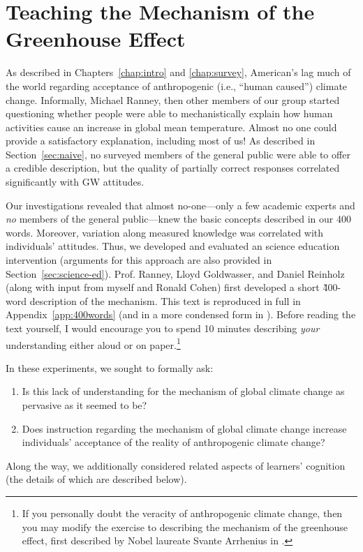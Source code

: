 \graphicspath{{mechanism/}}

\chapter{Teaching the Mechanism of the Greenhouse Effect}
\label{chap:mechanism}

As described in Chapters~\ref{chap:intro} and \ref{chap:survey}, American's lag
much of the world regarding acceptance of anthropogenic (i.e., “human caused”)
climate change. Informally, Michael Ranney, then other members of our group
started questioning whether people were able to mechanistically explain how
human activities cause an increase in global mean temperature.  Almost no one
could provide a satisfactory explanation, including most of us! As described in
Section~\ref{sec:naive}, no surveyed members of the general public were able to
offer a credible description, but the quality of partially correct responses
correlated significantly with GW attitudes. 

Our investigations revealed that almost no-one---only a few academic
experts and \emph{no} members of the general public---knew the basic
concepts described in our 400 words. Moreover, variation along measured
knowledge was correlated with individuals' attitudes. Thus, we developed and evaluated an
science education intervention (arguments for this approach are also provided in
Section~\ref{sec:science-ed}). Prof. Ranney, Lloyd Goldwasser, and Daniel
Reinholz (along with input from myself and Ronald Cohen) first developed a
short \~400-word description of the mechanism. This text is reproduced in full
in Appendix~\ref{app:400words} (and in a more condensed form in
\cite{ranney_improving_2012_f}).  Before reading the text yourself, I would
encourage you to spend 10 minutes describing \emph{your} understanding either
aloud or on paper.\footnote{If you personally doubt the veracity of
    anthropogenic climate change, then you may modify the exercise to describing
    the mechanism of the greenhouse effect, first described by Nobel laureate
    Svante Arrhenius in \citeyear{arrhenius_influence_1896}.}

 In these experiments, we sought to formally ask:
\begin{enumerate}
\item Is this lack of understanding for the mechanism of global climate change
    as pervasive as it seemed to be?
\item Does instruction regarding the mechanism of global climate change increase
    individuals' acceptance of the reality of anthropogenic climate change?
\end{enumerate}
Along the way, we additionally considered related aspects of learners'
cognition (the details of which are described below).


